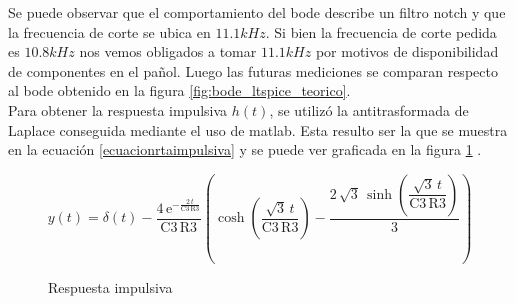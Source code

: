 Se puede observar que el comportamiento del bode describe un filtro notch y que la frecuencia de corte se ubica en $11.1kHz$. Si
bien la frecuencia de corte pedida es $10.8kHz$ nos vemos obligados a tomar $11.1kHz$ por motivos de disponibilidad de componentes
en el pañol. Luego las futuras mediciones se comparan respecto al bode obtenido en la figura \ref{fig:bode_ltspice_teorico}. \\

Para obtener la respuesta impulsiva $h(t)$, se utilizó la antitrasformada de Laplace conseguida mediante el uso de matlab. Esta resulto ser la que se muestra en la ecuación \ref{ecuacionrtaimpulsiva} y se puede ver graficada en la figura \ref{respuestaimpulsiva} .

\begin{equation}
y \! \left(t\right) = \delta \! \left(t\right) - \dfrac{4\, \mathrm{e}^{-\frac{2\, t}{\mathrm{C3}\, \mathrm{R3}}}} {\mathrm{C3}\, \mathrm{R3}} \left(\cosh\!\left(\dfrac{\sqrt{3}\, t}{\mathrm{C3}\, \mathrm{R3}}\right) - \dfrac{2\, \sqrt{3}\, \sinh\!\left(\dfrac{\sqrt{3}\, t}{\mathrm{C3}\, \mathrm{R3}}\right)}{3}\right)
\label{ecuacionrtaimpulsiva}
\end{equation}

\begin{figure}[H] 
\begin{center}
\caption{Respuesta impulsiva}
\label{respuestaimpulsiva}
\end{center}
\end{figure}



